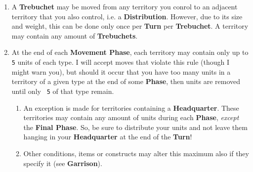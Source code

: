 \documentclass[10pt,openright,a4paper,openany]{article}
\newcommand{\num}[1]{\texttt{\color{purple} {#1}}}
\newcommand{\term}[1]{\textbf{\color{purple} #1}}
\newcommand{\headquarter}{\term{Headquarter}}
\begin{document}
\begin{enumerate}
	\item \label{rule:trebuchet-move}A \term{Trebuchet} may be moved from any territory you conrol to an adjacent territory that you also control, i.e. a \term{Distribution}. However, due to its size and weight, this can be done only once per \term{Turn} per \term{Trebuchet}. A territory may contain any amount of \term{Trebuchets}.
	\item \label{rule:max-units-in-land}At the end of each \term{Movement Phase}, each territory may contain only up to \num{5} units of each type. I will accept moves that violate this rule (though I might warn you), but should it occur that you have too many units in a territory of a given type at the end of some \term{Phase}, then units are removed until only \num{5} of that type remain.
	\begin{enumerate}
		\item An exception is made for territories containing a \headquarter{}. These territories may contain any amount of units during each \term{Phase}, \emph{except} the \term{Final Phase}. So, be sure to distribute your units and not leave them hanging in your \headquarter{} at the end of the \term{Turn}!
		\item Other conditions, items or constructs may alter this maximum also if they specify it (see \term{Garrison}).
	\end{enumerate}
\end{enumerate}
\end{document}
